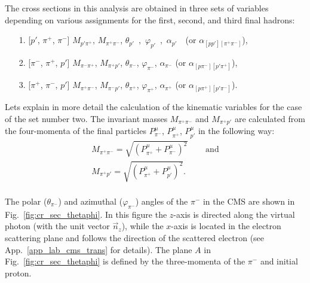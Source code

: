 The cross sections in this analysis are obtained in three sets of variables depending on various assignments for the first, second, and third final hadrons:\vspace{-0.5em}
\begin{itemize}
\item[1.] [$p'$, $\pi^{+}$, $\pi^{-}$]
$M_{p'\pi^{+}}$, $M_{\pi^{+}\pi^{-}}$, $\theta_{p'}$~,~$\varphi_{p'}$~,~$\alpha_{p'}$~~(or $\alpha_{[pp'][\pi^{+}\pi^{-}]}$),\vspace{-0.25em}

\item[2.] [$\pi^{-}$, $\pi^{+}$, $p'$]
$M_{\pi^{-}\pi^{+}}$, $M_{\pi^{+}p'}$, $\theta_{\pi^{-}}$, $\varphi_{\pi^{-}}$, $\alpha_{\pi^{-}}$ (or $\alpha_{[p\pi^{-}][p'\pi^{+}]}$),\vspace{-0.25em}

\item[3.]  [$\pi^{+}$, $\pi^{-}$, $p'$]
$M_{\pi^{+}\pi^{-}}$, $M_{\pi^{-}p'}$, $\theta_{\pi^{+}}$, $\varphi_{\pi^{+}}$, $\alpha_{\pi^{+}}$ (or $\alpha_{[p\pi^{+}][p'\pi^{-}]}$).\vspace{-0.5em}
\end{itemize}


Lets explain in more detail the calculation of the kinematic variables for the case of the set number two. The invariant masses $M_{\pi^{+}\pi^{-}}$ and $M_{\pi^{+}p'}$ are calculated from the four-momenta of the final particles $P_{\pi^{-}}^{\mu}$, $P_{\pi^{+}}^{\mu}$, $P_{p'}^{\mu}$ in the following way:
\begin{equation}
\begin{aligned}
M_{\pi^{+}\pi^{-}} = \sqrt{(P_{\pi^{+}}^{\mu} + P_{\pi^{-}}^{\mu})^{2}} & \text{~~~~and}\\ \label{invmasses}
M_{\pi^{+}p'} = \sqrt{(P_{\pi^{+}}^{\mu} + P_{p'}^{\mu})^{2}}. & \\ 
\end{aligned}  
\end{equation}  


The polar ($\theta_{\pi^{-}}$) and azimuthal ($\varphi_{\pi^{-}}$) angles of the $\pi^{-}$ in the CMS are shown in Fig.~\ref{fig:cr_sec_thetaphi}. In this figure the $z$-axis is directed along the virtual photon (with the unit vector $\vec n_{z}$), while the $x$-axis is located in the electron scattering plane and follows the direction of the scattered electron (see App.~\ref{app_lab_cms_trans} for details). The plane $A$ in Fig.~\ref{fig:cr_sec_thetaphi} is defined by the three-momenta of the $\pi^{-}$ and initial proton.  
	
